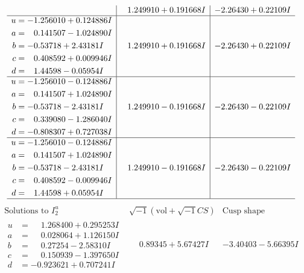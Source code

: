 \documentclass[1p]{elsarticle_modified}
\theoremstyle{definition}
\newcommand{\I}{\sqrt{-1}}
\begin{document}
$$\begin{array}{c|c|c}
 & \phantom{-}1.249910 + 0.191668 I & -2.26430 + 0.22109 I \\ \hline\begin{aligned}
u &= -1.256010 + 0.124886 I \\
a &= \phantom{-}0.141507 - 1.024890 I \\
b &= -0.53718 + 2.43181 I \\
c &= \phantom{-}0.408592 + 0.009946 I \\
d &= \phantom{-}1.44598 - 0.05954 I\end{aligned}
 & \phantom{-}1.249910 + 0.191668 I & -2.26430 + 0.22109 I \\ \hline\begin{aligned}
u &= -1.256010 - 0.124886 I \\
a &= \phantom{-}0.141507 + 1.024890 I \\
b &= -0.53718 - 2.43181 I \\
c &= \phantom{-}0.339080 - 1.286040 I \\
d &= -0.808307 + 0.727038 I\end{aligned}
 & \phantom{-}1.249910 - 0.191668 I & -2.26430 - 0.22109 I \\ \hline\begin{aligned}
u &= -1.256010 - 0.124886 I \\
a &= \phantom{-}0.141507 + 1.024890 I \\
b &= -0.53718 - 2.43181 I \\
c &= \phantom{-}0.408592 - 0.009946 I \\
d &= \phantom{-}1.44598 + 0.05954 I\end{aligned}
 & \phantom{-}1.249910 - 0.191668 I & -2.26430 - 0.22109 I\\
 \hline 
 \end{array}$$\newpage$$\begin{array}{c|c|c}  
\text{Solutions to }I^u_{2}& \I (\text{vol} + \sqrt{-1}CS) & \text{Cusp shape}\\
 \hline 
\begin{aligned}
u &= \phantom{-}1.268400 + 0.295253 I \\
a &= \phantom{-}0.028064 + 1.126150 I \\
b &= \phantom{-}0.27254 - 2.58310 I \\
c &= \phantom{-}0.150939 - 1.397650 I \\
d &= -0.923621 + 0.707241 I\end{aligned}
 & \phantom{-}0.89345 + 5.67427 I & -3.40403 - 5.66395 I \\ \hline\begin{aligned}

\end{aligned}
\end{array}$$
\end{document}
